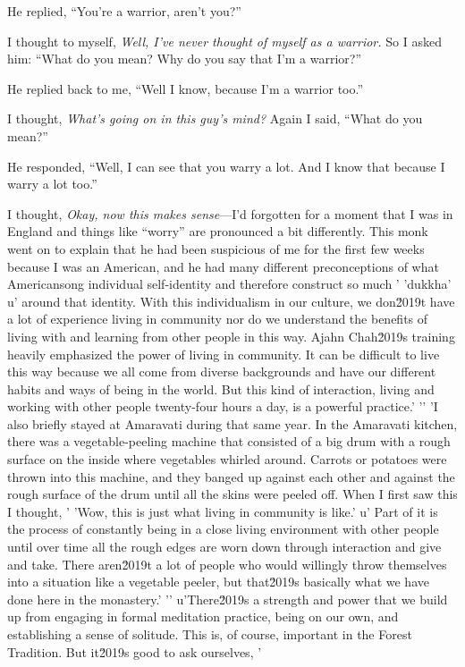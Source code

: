 He replied, ``You're a warrior, aren't you?''

I thought to myself, \emph{Well, I've never thought of myself as a 
warrior.} So I asked him: ``What do you mean? Why do you say that I'm a 
warrior?''

He replied back to me, ``Well I know, because I'm a warrior too.''

I thought, \emph{What's going on in this guy's mind?} Again I said, 
``What do you mean?''

He responded, ``Well, I can see that you warry a lot. And I know that 
because I warry a lot too.''

I thought, \emph{Okay, now this makes sense}---I'd forgotten for a 
moment that I was in England and things like ``worry'' are pronounced a 
bit differently. This monk went on to explain that he had been 
suspicious of me for the first few weeks because I was an American, and 
he had many different preconceptions of what Americansong individual self-identity and therefore construct so much '
'dukkha'
u' around that identity. With this individualism in our culture, we don\u2019t have a lot of experience living in community nor do we understand the benefits of living with and learning from other people in this way. Ajahn Chah\u2019s training heavily emphasized the power of living in community. It can be difficult to live this way because we all come from diverse backgrounds and have our different habits and ways of being in the world. But this kind of interaction, living and working with other people twenty-four hours a day, is a powerful practice.'
'\n'
'I also briefly stayed at Amaravati during that same year. In the Amaravati kitchen, there was a vegetable-peeling machine that consisted of a big drum with a rough surface on the inside where vegetables whirled around. Carrots or potatoes were thrown into this machine, and they banged up against each other and against the rough surface of the drum until all the skins were peeled off. When I first saw this I thought, '
'Wow, this is just what living in community is like.'
u' Part of it is the process of constantly being in a close living environment with other people until over time all the rough edges are worn down through interaction and give and take. There aren\u2019t a lot of people who would willingly throw themselves into a situation like a vegetable peeler, but that\u2019s basically what we have done here in the monastery.'
'\n'
u'There\u2019s a strength and power that we build up from engaging in formal meditation practice, being on our own, and establishing a sense of solitude. This is, of course, important in the Forest Tradition. But it\u2019s good to ask ourselves, '
